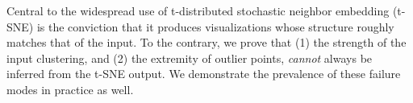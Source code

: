 



Central to the widespread use of t-distributed stochastic neighbor embedding \mbox{(t-SNE)} is the conviction that it produces visualizations whose structure roughly matches that of the input. To the contrary, we prove that (1) the strength of the input clustering, and (2) the extremity of outlier points, \emph{cannot} always be inferred from the t-SNE output. We demonstrate the prevalence of these failure modes in practice as well. 




















